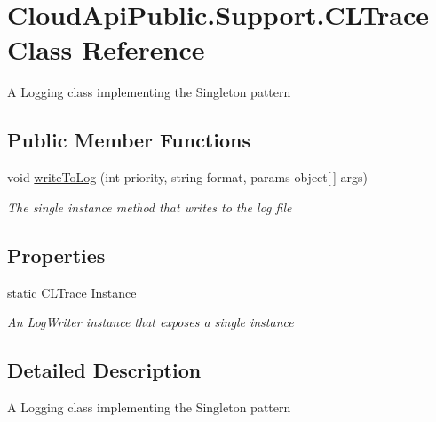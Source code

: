 \hypertarget{class_cloud_api_public_1_1_support_1_1_c_l_trace}{\section{Cloud\-Api\-Public.\-Support.\-C\-L\-Trace Class Reference}
\label{class_cloud_api_public_1_1_support_1_1_c_l_trace}
}


A Logging class implementing the Singleton pattern  


\subsection*{Public Member Functions}
\begin{DoxyCompactItemize}
\item 
void \hyperlink{class_cloud_api_public_1_1_support_1_1_c_l_trace_a48d83268eca0ea148c25094b3b343192}{write\-To\-Log} (int priority, string format, params object\mbox{[}$\,$\mbox{]} args)
\begin{DoxyCompactList}\small\item\em The single instance method that writes to the log file \end{DoxyCompactList}\end{DoxyCompactItemize}
\subsection*{Properties}
\begin{DoxyCompactItemize}
\item 
static \hyperlink{class_cloud_api_public_1_1_support_1_1_c_l_trace}{C\-L\-Trace} \hyperlink{class_cloud_api_public_1_1_support_1_1_c_l_trace_a0861d3bda40d01c666acb82cef1cb595}{Instance}
\begin{DoxyCompactList}\small\item\em An Log\-Writer instance that exposes a single instance \end{DoxyCompactList}\end{DoxyCompactItemize}


\subsection{Detailed Description}
A Logging class implementing the Singleton pattern 



